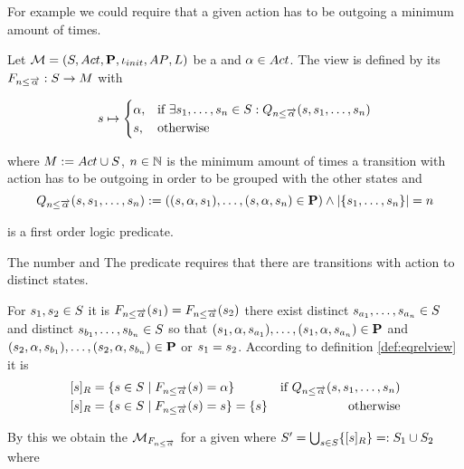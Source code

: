 \documentclass[preview]{standalone}
\begin{document}
For example we could require that a given action has to be outgoing a minimum amount of times. 

\begin{definition}
	Let ${{{\mathcal{M}}}} = {{({S}, {Act}, {\textbf{P}}, {\iota_{init}}, {AP}, {L})}}$ be a \chosengraphtypeN and ${\alpha} \in {Act}$. The view \viewminoutaction is defined by its \grpfctN ${{{{F}}_{{n}\leq{\overrightarrow{\ensuremath{{\alpha}}}}}}} : {S} \to {M}$ with
	
	\[
	{s} \mapsto
	\begin{cases}
		{\alpha},				& \text{if } \exists {s}_1, \dots, {s}_{n} \in {S}:  {Q_{{n}\leq{\overrightarrow{\ensuremath{{\alpha}}}}}({s},{s}_1, \dots, {s}_{{n}})}\\
		{s},          	& \text{otherwise}
	\end{cases}
	\]
	
	where ${{M}} := {{Act} \cup {S}}$, ${n} \in {\mathbb{N}}$ is the minimum amount of times a transition with action \action has to be outgoing in order to be grouped with the other states and
	\[
	{Q_{{n}\leq{\overrightarrow{\ensuremath{{\alpha}}}}}({s},{s}_1, \dots, {s}_{{n}})} := (({s}, {\alpha}, {s}_1), \dots, ({s}, {\alpha}, {s}_{n}) \in {\ensuremath{{\textbf{P}}}}) \land |\{{s}_1, \dots, {s}_{n}\}| = {n}
	\]
	
	is a first order logic predicate.
	\label{def:minoutaction}
\end{definition}

The number  and  
The predicate \predminoutact requires that there are transitions with action \action to \numoutact distinct states.

For ${s}_1,{s}_2 \in {S}$ it is ${{{{F}}_{{n}\leq{\overrightarrow{\ensuremath{{\alpha}}}}}}}({s}_1) = {{{{F}}_{{n}\leq{\overrightarrow{\ensuremath{{\alpha}}}}}}}({s}_2)$ \iffN there exist distinct ${s}_{a_1}, \dots, {s}_{a_{n}} \in {S}$ and distinct ${s}_{b_1}, \dots, {s}_{b_{n}} \in {S}$ so that $({s}_1, {\alpha}, {s}_{a_1}), \dots, ({s}_1, {\alpha}, {s}_{a_{n}}) \in {\ensuremath{{\textbf{P}}}}$ and $({s}_2, {\alpha}, {s}_{b_1}), \dots, ({s}_2, {\alpha}, {s}_{b_{n}}) \in {\ensuremath{{\textbf{P}}}}$ or ${s}_1 = {s}_2$. According to definition \ref{def:eqrelview} it is 
\begin{align*}
	\eqclassv{\state} &= \{\state \in \states \mid \gfctminoutaction(\state) = \action\} &\text{if } \predminoutact \\ 
	\eqclassv{\state} &= \{\state \in \states \mid \gfctminoutaction(\state) = \state\} = \{\state\} &\text{ otherwise}
\end{align*}

By this we obtain the \viewN ${{{{{\mathcal{M}}}}_{{{{F}}_{{n}\leq{\overrightarrow{\ensuremath{{\alpha}}}}}}}}}$ for a given \chosengraphtypeN \chgph where ${S}' = \bigcup_{{s} \in {S}} \{{{[{s}]_{{R}}}}\} =: {S}_1 \cup {S}_2$ where 
\end{document}
